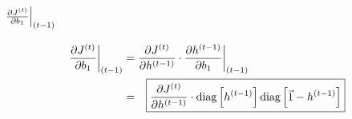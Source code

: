 \subsubsection[short]{$\restr{\frac{\partial J^{(t)}}{\partial b_1}}{(t-1)}$}

\begin{equation}
  \begin{aligned}
    \restr{\frac{\partial J^{(t)}}{\partial b_1}}{(t-1)} &= \frac{\partial J^{(t)}}{\partial h^{(t-1)}} \cdot \restr{\frac{\partial h^{(t-1)}}{\partial b_1}}{(t-1)} \\
    &= \Aboxed{ \frac{\partial J^{(t)}}{\partial h^{(t-1)}} \cdot \text{diag}\left[ h^{(t-1)} \right]  \text{diag}\left[ \vec{1} - h^{(t-1)} \right] } 
  \end{aligned}
\end{equation}